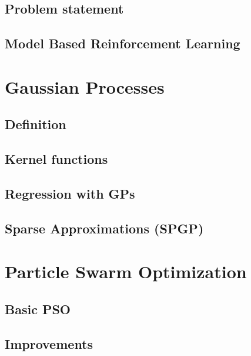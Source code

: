 \subsection{Problem statement}
\subsection{Model Based Reinforcement Learning}
\section{Gaussian Processes}
\subsection{Definition}
\subsection{Kernel functions}
\subsection{Regression with GPs}
\subsection{Sparse Approximations (SPGP)}
\section{Particle Swarm Optimization}
\subsection{Basic PSO}
\subsection{Improvements}
